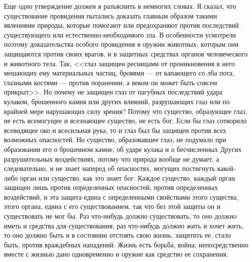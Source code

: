 \documentclass[12pt]{article}
\begin{document}
Еще одно утверждение должен я разъяснить в немногих словах. Я сказал, что существование провидения пытались доказать главным образом такими явлениями природы, которые помогают или предохраняют против последствий существующего или естественно-необходимого зла. В особенности усмотрели поэтому доказательства особого провидения в оружии животных, которым они защищаются против своих врагов, и в защитных средствах органов человеческого и животного тела. Так, <<глаз защищен ресницами от проникновения в него мешающих ему материальных частиц, бровями --- от капающего со лба пота, глазными костями --- против поранении, а веком он может быть совсем прикрыт>>. Но почему не защищен глаз от пагубных последствий удара кулаком, брошенного камня или других влияний, разрушающих глаз или по крайней мере нарушающих силу зрения? Потому что существо, образующее глаз, не есть всемогущее и всезнающее существо, не есть бог. Если бы глаз сотворило всевидящее око и всесильная рука, то и глаз был бы защищен против всех возможных опасностей. Но существо, образовавшее глаз, не подумало при образовании его о брошенном камне, об ударе кулака и о бесчисленных Других разрушительных воздействиях, потому что природа вообще не думает, а следовательно, и не знает наперед об опасностях, могущих постигнуть какой-либо орган или существо, как это знает бог. Каждое существо, каждый орган защищен лишь против определенных опасностей, против определенных воздействий, и эта защита едина с определенными свойствами этого существа, этого органа, едина с его существованием, так что без этой защиты он и существовать не мог бы. Раз что-нибудь должно существовать, то оно должно иметь и средства для существования, раз что-нибудь должно жить и хочет жить, то оно должно быть и в состоянии отстоять свою жизнь, защитить ее, стало быть, против враждебных нападений. Жизнь есть борьба, война; непосредственно вместе с жизнью дано одновременно и оружие как средство ее сохранения. 
\end{document}
